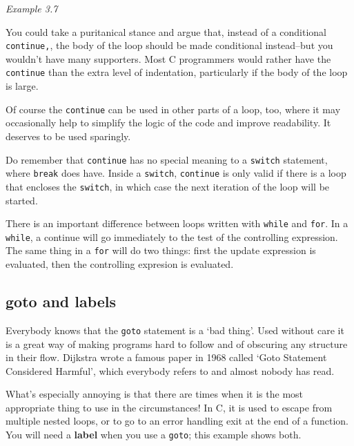    \begin{center}\textit{Example 3.7}\end{center}


   You could take a puritanical stance and argue that, instead of a
    conditional \texttt{continue,}, the body of the loop should be made
    conditional instead--but you wouldn't have many supporters. Most C
    programmers would rather have the \texttt{continue} than the extra
    level of indentation, particularly if the body of the loop is large.


   Of course the \texttt{continue} can be used in other parts of a
    loop, too, where it may occasionally help to simplify the logic of the
    code and improve readability. It deserves to be used sparingly.


   Do remember that \texttt{continue} has no special meaning to a
    \texttt{switch} statement, where \texttt{break} does have. Inside
    a \texttt{switch}, \texttt{continue} is only valid if there is a
    loop that encloses the \texttt{switch}, in which case the next
    iteration of the loop will be started.


   There is an important difference between loops written with
    \texttt{while} and \texttt{for}. In a \texttt{while}, a
    continue will go immediately to the test of the controlling expression.
    The same thing in a \texttt{for} will do two things: first the update
    expression is evaluated, then the controlling expresion is evaluated.


  

  \subsection{goto and labels}
   

   Everybody knows that the \texttt{goto} statement is a `bad
    thing'. Used without care it is a great way of making programs hard to
    follow and of obscuring any structure in their flow. Dijkstra wrote a
    famous paper in 1968 called `Goto Statement Considered Harmful',
    which everybody refers to and almost nobody has read.


   What's especially annoying is that there are times when it is the most
    appropriate thing to use in the circumstances! In C, it is used to
    escape from multiple nested loops, or to go to an error handling exit at
    the end of a function. You will need a \textbf{label} when you use a
    \texttt{goto}; this example shows both.


